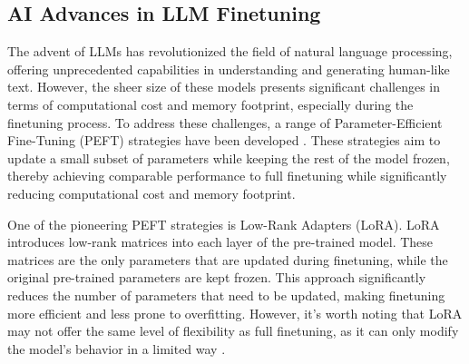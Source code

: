 \documentclass{article}
\begin{document}
\subsection{AI Advances in LLM Finetuning}


The advent of LLMs has revolutionized the field of natural language processing, offering unprecedented capabilities in understanding and generating human-like text. However, the sheer size of these models presents significant challenges in terms of computational cost and memory footprint, especially during the finetuning process. To address these challenges, a range of Parameter-Efficient Fine-Tuning (PEFT) strategies have been developed \cite{chen2023parameter}. These strategies aim to update a small subset of parameters while keeping the rest of the model frozen, thereby achieving comparable performance to full finetuning while significantly reducing computational cost and memory footprint.

One of the pioneering PEFT strategies is Low-Rank Adapters (LoRA). LoRA introduces low-rank matrices into each layer of the pre-trained model. These matrices are the only parameters that are updated during finetuning, while the original pre-trained parameters are kept frozen. This approach significantly reduces the number of parameters that need to be updated, making finetuning more efficient and less prone to overfitting. However, it's worth noting that LoRA may not offer the same level of flexibility as full finetuning, as it can only modify the model's behavior in a limited way \cite{hu2023llm}.
\end{document}
